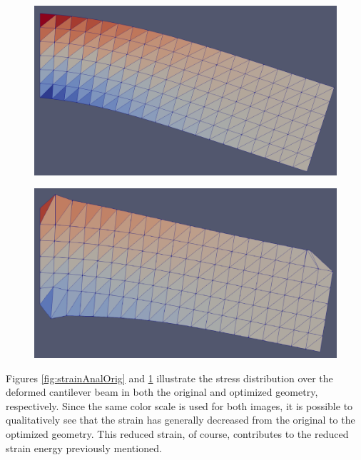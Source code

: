 \begin{figure}[ht]
\centering
\begin{minipage}{.5\textwidth}
  \centering
  \includegraphics[width=0.9\linewidth]{images/strainAnalysis_original.png}
  \label{fig:strainAnalOrig}
\end{minipage}%
\begin{minipage}{.5\textwidth}
  \centering
  \includegraphics[width=0.9\linewidth]{images/strainAnalysis_optimized.png}
  \label{fig:strainAnalOpt}
\end{minipage}
\end{figure}
Figures \ref{fig:strainAnalOrig} and \ref{fig:strainAnalOpt} illustrate the stress distribution over the deformed cantilever beam in both the original and optimized geometry, respectively. Since the same color scale is used for both images, it is possible to qualitatively see that the strain has generally decreased from the original to the optimized geometry. This reduced strain, of course, contributes to the reduced strain energy previously mentioned.\\[3pt]
